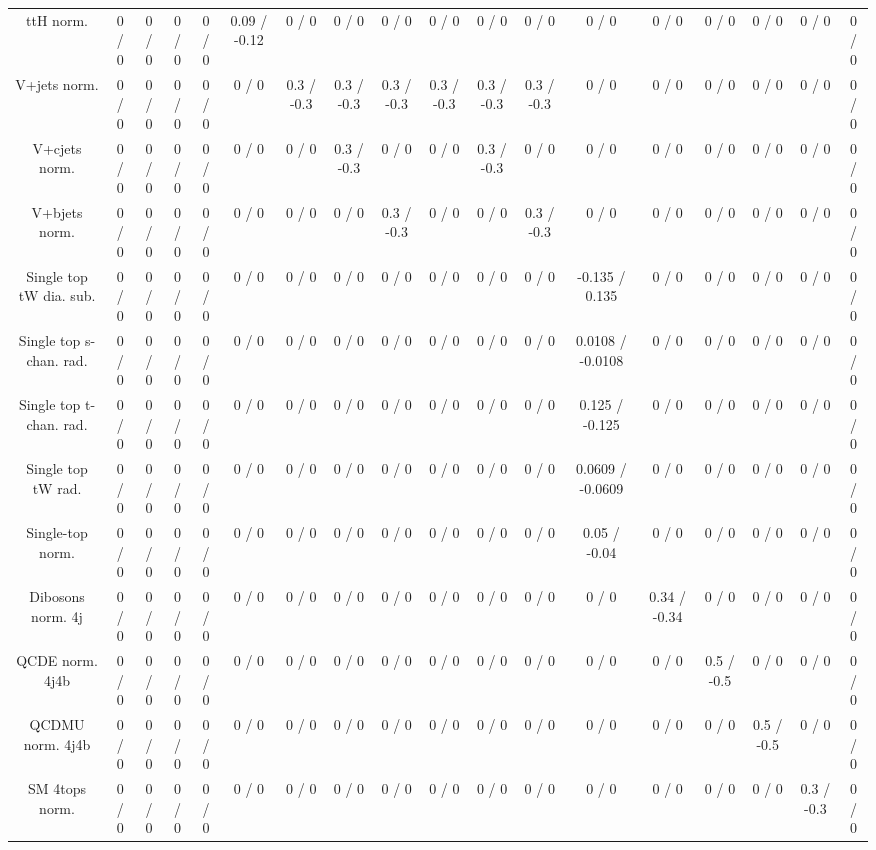 \documentclass[10pt]{article}
\begin{document}
\begin{table}[htbp]
\begin{center}
\begin{tabular}{|c|c|c|c|c|c|c|c|c|c|c|c|c|c|c|c|c|c|}
  ttH norm. & 0 / 0 & 0 / 0 & 0 / 0 & 0 / 0 & 0.09 / -0.12 & 0 / 0 & 0 / 0 & 0 / 0 & 0 / 0 & 0 / 0 & 0 / 0 & 0 / 0 & 0 / 0 & 0 / 0 & 0 / 0 & 0 / 0 & 0 / 0 \\ 
  V+jets norm. & 0 / 0 & 0 / 0 & 0 / 0 & 0 / 0 & 0 / 0 & 0.3 / -0.3 & 0.3 / -0.3 & 0.3 / -0.3 & 0.3 / -0.3 & 0.3 / -0.3 & 0.3 / -0.3 & 0 / 0 & 0 / 0 & 0 / 0 & 0 / 0 & 0 / 0 & 0 / 0 \\ 
  V+cjets norm. & 0 / 0 & 0 / 0 & 0 / 0 & 0 / 0 & 0 / 0 & 0 / 0 & 0.3 / -0.3 & 0 / 0 & 0 / 0 & 0.3 / -0.3 & 0 / 0 & 0 / 0 & 0 / 0 & 0 / 0 & 0 / 0 & 0 / 0 & 0 / 0 \\ 
  V+bjets norm. & 0 / 0 & 0 / 0 & 0 / 0 & 0 / 0 & 0 / 0 & 0 / 0 & 0 / 0 & 0.3 / -0.3 & 0 / 0 & 0 / 0 & 0.3 / -0.3 & 0 / 0 & 0 / 0 & 0 / 0 & 0 / 0 & 0 / 0 & 0 / 0 \\ 
  Single top tW dia. sub. & 0 / 0 & 0 / 0 & 0 / 0 & 0 / 0 & 0 / 0 & 0 / 0 & 0 / 0 & 0 / 0 & 0 / 0 & 0 / 0 & 0 / 0 & -0.135 / 0.135 & 0 / 0 & 0 / 0 & 0 / 0 & 0 / 0 & 0 / 0 \\ 
  Single top s-chan. rad. & 0 / 0 & 0 / 0 & 0 / 0 & 0 / 0 & 0 / 0 & 0 / 0 & 0 / 0 & 0 / 0 & 0 / 0 & 0 / 0 & 0 / 0 & 0.0108 / -0.0108 & 0 / 0 & 0 / 0 & 0 / 0 & 0 / 0 & 0 / 0 \\ 
  Single top t-chan. rad. & 0 / 0 & 0 / 0 & 0 / 0 & 0 / 0 & 0 / 0 & 0 / 0 & 0 / 0 & 0 / 0 & 0 / 0 & 0 / 0 & 0 / 0 & 0.125 / -0.125 & 0 / 0 & 0 / 0 & 0 / 0 & 0 / 0 & 0 / 0 \\ 
  Single top tW rad. & 0 / 0 & 0 / 0 & 0 / 0 & 0 / 0 & 0 / 0 & 0 / 0 & 0 / 0 & 0 / 0 & 0 / 0 & 0 / 0 & 0 / 0 & 0.0609 / -0.0609 & 0 / 0 & 0 / 0 & 0 / 0 & 0 / 0 & 0 / 0 \\ 
  Single-top norm. & 0 / 0 & 0 / 0 & 0 / 0 & 0 / 0 & 0 / 0 & 0 / 0 & 0 / 0 & 0 / 0 & 0 / 0 & 0 / 0 & 0 / 0 & 0.05 / -0.04 & 0 / 0 & 0 / 0 & 0 / 0 & 0 / 0 & 0 / 0 \\ 
  Dibosons norm. 4j & 0 / 0 & 0 / 0 & 0 / 0 & 0 / 0 & 0 / 0 & 0 / 0 & 0 / 0 & 0 / 0 & 0 / 0 & 0 / 0 & 0 / 0 & 0 / 0 & 0.34 / -0.34 & 0 / 0 & 0 / 0 & 0 / 0 & 0 / 0 \\ 
  QCDE norm. 4j4b & 0 / 0 & 0 / 0 & 0 / 0 & 0 / 0 & 0 / 0 & 0 / 0 & 0 / 0 & 0 / 0 & 0 / 0 & 0 / 0 & 0 / 0 & 0 / 0 & 0 / 0 & 0.5 / -0.5 & 0 / 0 & 0 / 0 & 0 / 0 \\ 
  QCDMU norm. 4j4b & 0 / 0 & 0 / 0 & 0 / 0 & 0 / 0 & 0 / 0 & 0 / 0 & 0 / 0 & 0 / 0 & 0 / 0 & 0 / 0 & 0 / 0 & 0 / 0 & 0 / 0 & 0 / 0 & 0.5 / -0.5 & 0 / 0 & 0 / 0 \\ 
  SM 4tops norm. & 0 / 0 & 0 / 0 & 0 / 0 & 0 / 0 & 0 / 0 & 0 / 0 & 0 / 0 & 0 / 0 & 0 / 0 & 0 / 0 & 0 / 0 & 0 / 0 & 0 / 0 & 0 / 0 & 0 / 0 & 0.3 / -0.3 & 0 / 0 \\ 

\end{tabular}
\end{center}
\end{table}
\end{document}
